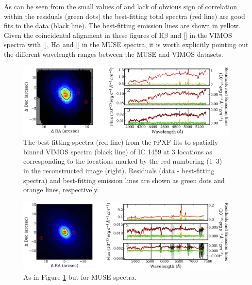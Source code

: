 			As can be seen from the small values of and lack of obvious sign of correlation within the residuals (green dots) the best-fitting total spectra (red line) are good fits to the data (black line). The best-fitting emission lines are shown in yellow. Given the coincidental alignment in these figures of H$\beta$ and [] in the VIMOS spectra with [], H$\alpha$ and [] in the MUSE spectra, it is worth explicitly pointing out the different wavelength ranges between the MUSE and VIMOS datasets. 

			\begin{landscape}
				\begin{figure}
					\centering
					\includegraphics[height=.4\textheight]{chapter4/pPXF_fits_vimos_ic1459.png}
					\caption[Best-fitting spectra by \textsc{pPXF} for the VIMOS datacube for IC 1459]{The best-fitting spectra (red line) from the \textsc{pPXF} fits to spatially-binned VIMOS spectra (black line) of IC 1459 at 3 locations as corresponding to the locations marked by the red numbering (1--3) in the reconstructed image (right). Residuals (data - best-fitting spectra) and best-fitting emission lines are shown as green dots and orange lines, respectively.}
					\label{fig:ppxf1}
				\end{figure}
				\begin{figure}
					\centering
					\includegraphics[height=.4\textheight]{chapter4/pPXF_fits_muse_ic1459.png}
					\caption[Best-fitting spectra by \textsc{pPXF} for the MUSE datacube for IC 1459]{As in Figure \ref{fig:ppxf1} but for MUSE spectra.}
					\label{fig:ppxf2}

\end{figure}
\end{landscape}
